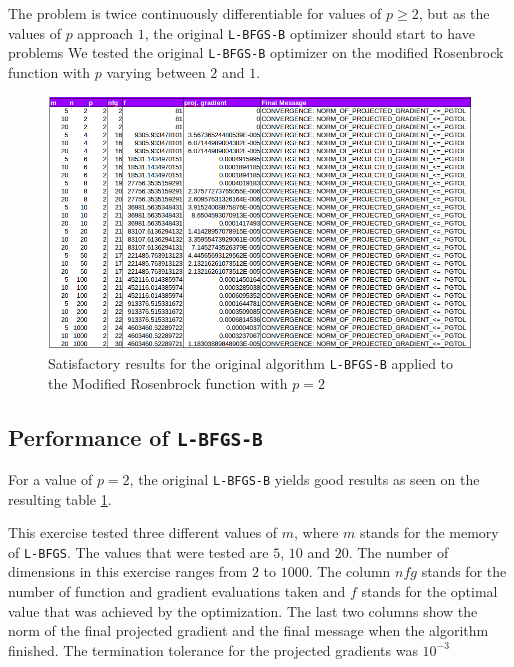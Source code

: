 The problem is twice continuously differentiable for values of $p \geq 2$, but as the values of $p$ approach $1$, the original \texttt{L-BFGS-B} optimizer should start to have problems We tested the original \texttt{L-BFGS-B} optimizer on the modified Rosenbrock function with $p$ varying between $2$ and $1$. 


\begin{figure}
\begin{center}
\includegraphics[scale=0.48]{Figures/Nocedalp2.png}
\caption[Modified Rosenbrock with $p = 2$]{Satisfactory results for the original algorithm \texttt{L-BFGS-B} applied to the Modified Rosenbrock function with $p = 2$}
\label{pequal2}
\end{center}
\end{figure}

\subsection{Performance of \texttt{L-BFGS-B}}

For a value of $p = 2$, the original \texttt{L-BFGS-B} yields good results as seen on the resulting table \ref{pequal2}.

This exercise tested three different values of $m$, where $m$ stands for the memory of \texttt{L-BFGS}. The values that were tested are $5$, $10$ and $20$. The number of dimensions in this exercise ranges from $2$ to $1000$. The column $nfg$ stands for the number of function and gradient evaluations taken and $f$ stands for the optimal value that was achieved by the optimization. The last two columns show the norm of the final projected gradient and the final message when the algorithm finished. The termination tolerance for the projected gradients was $10^{-3}$


